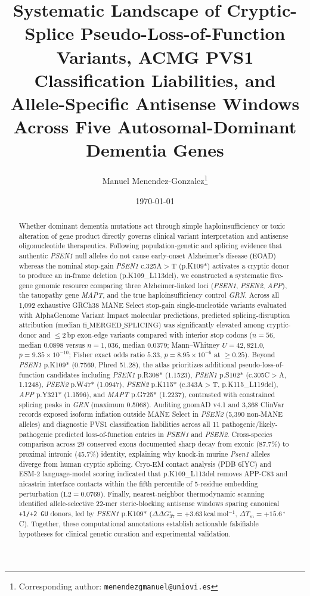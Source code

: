 \documentclass[11pt,a4paper]{article}
\title{Systematic Landscape of Cryptic-Splice Pseudo-Loss-of-Function Variants, ACMG PVS1 Classification Liabilities, and Allele-Specific Antisense Windows Across Five Autosomal-Dominant Dementia Genes}
\author[1,2,3]{Manuel Menendez-Gonzalez\thanks{Corresponding author: \texttt{menendezgmanuel@uniovi.es}}}
\affil[1]{Medicine Department, Oviedo University, Oviedo, Spain}
\affil[2]{Neurology Department, Hospital Universitario Central de Asturias (HUCA), Oviedo, Spain}
\affil[3]{Instituto de Investigaci{\'o}n Sanitaria del Principado de Asturias (ISPA), Oviedo, Spain}
\date{\today}
\begin{document}
\maketitle

\begin{abstract}
Whether dominant dementia mutations act through simple haploinsufficiency or toxic alteration of gene product directly governs clinical variant interpretation and antisense oligonucleotide therapeutics. Following population-genetic and splicing evidence that authentic \textit{PSEN1} null alleles do not cause early-onset Alzheimer's disease (EOAD) whereas the nominal stop-gain \textit{PSEN1} c.325A$>$T (p.K109*) activates a cryptic donor to produce an in-frame deletion (p.K109\_L113del), we constructed a systematic five-gene genomic resource comparing three Alzheimer-linked loci (\textit{PSEN1}, \textit{PSEN2}, \textit{APP}), the tauopathy gene \textit{MAPT}, and the true haploinsufficiency control \textit{GRN}. Across all 1,092 exhaustive GRCh38 MANE Select stop-gain single-nucleotide variants evaluated with AlphaGenome Variant Impact molecular predictions, predicted splicing-disruption attribution (median $\mathrm{fi\_MERGED\_SPLICING}$) was significantly elevated among cryptic-donor and $\leq$2\,bp exon-edge variants compared with interior stop codons ($n=56$, median 0.0898 versus $n=1,036$, median 0.0379; Mann--Whitney $U=42,821.0$, $p=9.35\times 10^{-10}$; Fisher exact odds ratio $5.33$, $p=8.95\times 10^{-6}$ at $\geq 0.25$). Beyond \textit{PSEN1} p.K109* (0.7569, Phred 51.28), the atlas prioritizes additional pseudo-loss-of-function candidates including \textit{PSEN1} p.R308* (1.1523), \textit{PSEN1} p.S102* (c.305C$>$A, 1.1248), \textit{PSEN2} p.W47* (1.0947), \textit{PSEN2} p.K115* (c.343A$>$T, p.K115\_L119del), \textit{APP} p.Y321* (1.1596), and \textit{MAPT} p.G725* (1.2237), contrasted with constrained splicing peaks in \textit{GRN} (maximum 0.5068). Auditing gnomAD v4.1 and 3,368 ClinVar records exposed isoform inflation outside MANE Select in \textit{PSEN2} (5,390 non-MANE alleles) and diagnostic PVS1 classification liabilities across all 11 pathogenic/likely-pathogenic predicted loss-of-function entries in \textit{PSEN1} and \textit{PSEN2}. Cross-species comparison across 29 conserved exons documented sharp decay from exonic (87.7\%) to proximal intronic (45.7\%) identity, explaining why knock-in murine \textit{Psen1} alleles diverge from human cryptic splicing. Cryo-EM contact analysis (PDB 6IYC) and ESM-2 language-model scoring indicated that p.K109\_L113del removes APP-C83 and nicastrin interface contacts within the fifth percentile of 5-residue embedding perturbation ($\mathrm{L2}=0.0769$). Finally, nearest-neighbor thermodynamic scanning identified allele-selective 22-mer steric-blocking antisense windows sparing canonical \texttt{+1/+2\,GU} donors, led by \textit{PSEN1} p.K109* ($\Delta\Delta G^\circ_{37}=+3.63$\,kcal\,mol$^{-1}$, $\Delta T_m=+15.6\,^\circ$C). Together, these computational annotations establish actionable falsifiable hypotheses for clinical genetic curation and experimental validation.
\end{abstract}
\end{document}
